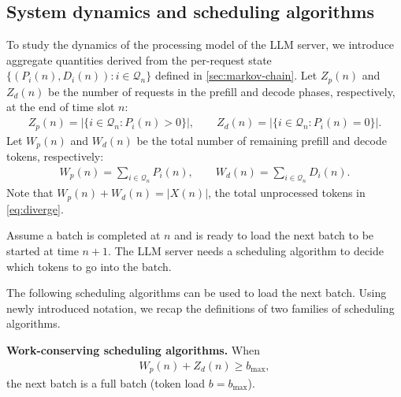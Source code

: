 \documentclass[11pt]{article}
\theoremstyle{plain}
\theoremstyle{definition}
\theoremstyle{remark}
\providecommand{\abs}[1]{\lvert#1\rvert}
\begin{document}
\subsection{System dynamics and scheduling algorithms}
\label{sec:dynamics}
To study the dynamics of the processing model of the LLM server, we introduce aggregate quantities derived from the per-request state $\{(P_i(n), D_i(n)) : i \in \mathcal{Q}_n\}$ defined in \cref{sec:markov-chain}.
Let $Z_p(n)$ and $Z_d(n)$ be the number of requests in the prefill and decode phases, respectively, at the end of time slot $n$:
\begin{align*}
  Z_p(n) = \abs{\{i \in \mathcal{Q}_n : P_i(n) > 0\}}, \qquad Z_d(n) = \abs{\{i \in \mathcal{Q}_n : P_i(n) = 0\}}.
\end{align*}
Let $W_p(n)$ and $W_d(n)$ be the total number of remaining prefill and decode tokens, respectively:
\begin{align*}
  W_p(n) = \sum_{i \in \mathcal{Q}_n} P_i(n), \qquad W_d(n) = \sum_{i \in \mathcal{Q}_n} D_i(n).
\end{align*}
Note that $W_p(n) + W_d(n) = \abs{X(n)}$, the total unprocessed tokens in \cref{eq:diverge}.

Assume a batch is completed at $n$ and is ready to load the next
batch to be started at time $n+1$. The LLM server needs a scheduling algorithm
to decide which tokens to go into the batch.

The following scheduling algorithms can be
used to load the next batch. Using newly introduced notation, we recap the
definitions of two families of scheduling algorithms.

\noindent \textbf{Work-conserving scheduling algorithms.}
When
\begin{align}\label{eq:conserv}
  W_p(n)+ Z_d(n) \ge b_{\max},
\end{align}
the next batch is a full batch (token load $b = b_{\max}$).
\end{document}
